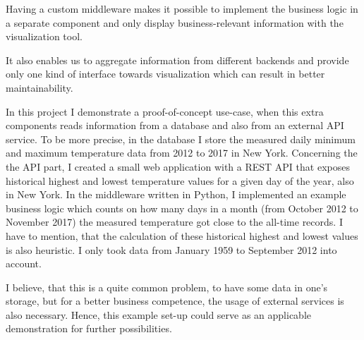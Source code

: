 Having a custom middleware makes it possible to implement the business logic in a separate component and only display business-relevant information with the visualization tool.

It also enables us to aggregate information from different backends and provide only one kind of interface towards visualization which can result in better maintainability.

In this project I demonstrate a proof-of-concept use-case, when this extra components reads information from a database and also from an external API service. To be more precise, in the database I store the measured daily minimum and maximum temperature data from 2012 to 2017 in New York. Concerning the the API part, I created a small web application with a REST API that exposes historical highest and lowest temperature values for a given day of the year, also in New York. In the middleware written in Python, I implemented an example business logic which counts on how many days in a month (from October 2012 to November 2017) the measured temperature got close to the all-time records. I have to mention, that the calculation of these historical highest and lowest values is also heuristic. I only took data from January 1959 to September 2012 into account.

I believe, that this is a quite common problem, to have some data in one's storage, but for a better business competence, the usage of external services is also necessary. Hence, this example set-up could serve as an applicable demonstration for further possibilities.